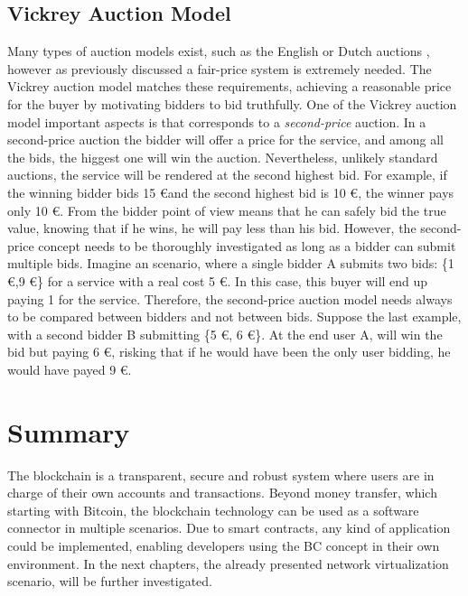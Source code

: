 \subsection{Vickrey Auction Model}

Many types of auction models exist, such as the English or Dutch auctions \cite{coppinger1980incentives}, however as previously discussed a fair-price system is extremely needed. The Vickrey auction model \cite{vickrey1961counterspeculation} matches these requirements, achieving a reasonable price for the buyer by motivating bidders to bid truthfully. One of the Vickrey auction model important aspects is that corresponds to a \textit{second-price} auction. In a second-price auction the bidder will offer a price for the service, and among all the bids, the higgest one will win the auction. Nevertheless, unlikely standard auctions, the service will be rendered at the second highest bid. For example, if the winning bidder bids 15 \euro and the second highest bid is 10 \euro, the winner pays only 10 \euro. From the bidder point of view means that he can safely bid the true value, knowing that if he wins, he will pay less than his bid. However, the second-price concept needs to be thoroughly investigated as long as a bidder can submit multiple bids. Imagine an scenario, where a single bidder A submits two bids: \{1 \euro,9 \euro\} for a service with a real cost 5 \euro. In this case, this buyer will end up paying 1 for the service. Therefore, the second-price auction model needs always to be compared between bidders and not between bids. Suppose the last example, with a second bidder B submitting \{5 \euro, 6 \euro\}. At the end user A, will win the bid but paying 6 \euro, risking that if he would have been the only user bidding, he would have payed 9 \euro.

\section{Summary}

The blockchain is a transparent, secure and robust system where users are in charge of their own accounts and transactions. Beyond money transfer, which starting with Bitcoin, the blockchain technology can be used as a software connector in multiple scenarios. Due to smart contracts, any kind of application could be implemented, enabling developers using the BC concept in their own environment. In the next chapters, the already presented network virtualization scenario, will be further investigated.

